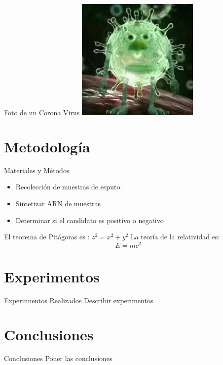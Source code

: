 \documentclass{beamer}
\begin{document}
\begin{frame}{Foto de un Corona Virus}
    \centering
    \includegraphics[width=\textwidth]{figuras/covid.jpeg}\\
\end{frame}

\section{Metodología}
\begin{frame}{Materiales y Métodos}
    \begin{itemize}
        \item Recolección de muestras de esputo.
        \item Sintetizar ARN de muestras
        \item Determinar si el candidato es positivo o negativo
    \end{itemize}
    
    El teorema de Pitágoras es : $z^2 = x^2 +y^2$
    La teoría de la relatividad es:
    \begin{equation*}
        E = mc^2    
    \end{equation*}

\end{frame}
\usebackgroundtemplate{}
\section{Experimentos}
\begin{frame}{Experiimentos Realizados}
    Describir experimentos
\end{frame}

\section{Conclusiones}
\begin{frame}{Conclusiones}
    Poner las conclusiones
\end{frame}
\end{document}
